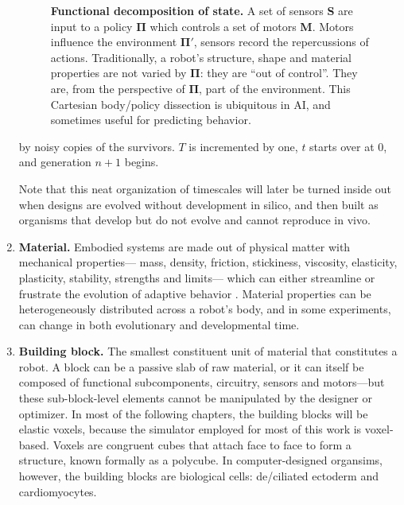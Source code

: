 \begin{enumerate}
\begin{figure}[H]
\begin{minipage}[t]{0.47\linewidth}
        \caption{\label{fig:policy}\textbf{Functional decomposition of state.} A set of sensors {\rm\textbf{S}} are input to a policy $\mathbf{\Pi}$ which controls a set of motors {\rm\textbf{M}}.
        Motors influence the environment $\mathbf{\Pi'}$, sensors record the repercussions of actions.
        Traditionally, a robot's structure, shape and material properties are not varied by $\mathbf{\Pi}$: they are ``out of control''.
        They are, from the perspective of $\mathbf{\Pi}$, part of the environment.
        This Cartesian body/policy
        dissection is ubiquitous in AI, and sometimes useful for predicting behavior.
        }
    \end{minipage}
    \end{figure}
    by noisy copies of the survivors.
    $T$ is incremented by one, $t$ starts over at 0, and generation $n+1$ begins.
    
    
    
    Note that this neat organization of timescales will
    later be turned inside out when designs are evolved without development in silico, and then built as organisms that develop but do not evolve and cannot reproduce in vivo.
    
    \item \textbf{Material.} Embodied systems are made out of physical matter
    with mechanical properties---%
    mass, density, friction,
    stickiness,
    viscosity,
    elasticity, plasticity,
    stability,
    strengths and limits---%
    which can either streamline or frustrate the evolution of adaptive behavior 
    \cite{vaughan2004evolution}.
    Material properties can be heterogeneously distributed across a robot's body, and in some experiments, 
    can change in both evolutionary and developmental time.

    
    \item \textbf{Building block.} 
    The smallest constituent unit of material that constitutes a robot.
    A block can be a passive slab of raw material,
    or it can itself be composed
    of functional subcomponents, circuitry, sensors and motors---but these sub-block-level elements cannot be manipulated by the designer or optimizer.
    In most of the following chapters,
    the building blocks will be elastic voxels, because the simulator employed for most of this work is voxel-based.
    Voxels are
    congruent cubes that attach face to face to form a structure, known formally as a polycube.
    In computer-designed organsims, however, the building blocks are biological cells: de/ciliated ectoderm and cardiomyocytes.
    

\end{enumerate}
